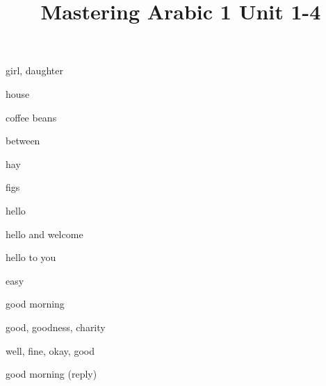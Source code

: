 \documentclass[avery5371,grid,frame]{flashcards}
\title{Mastering Arabic 1 Unit 1-4}
\begin{document}
\begin{flashcard}{\LARGE girl, daughter}
\LARGE {}
\end{flashcard}
\begin{flashcard}{\LARGE house}
\LARGE {}
\end{flashcard}
\begin{flashcard}{\LARGE coffee beans}
\LARGE {}
\end{flashcard}
\begin{flashcard}{\LARGE between}
\LARGE {}
\end{flashcard}
\begin{flashcard}{\LARGE hay}
\LARGE {}
\end{flashcard}
\begin{flashcard}{\LARGE figs}
\LARGE {}
\end{flashcard}
\begin{flashcard}{\LARGE hello}
\LARGE {}
\end{flashcard}
\begin{flashcard}{\LARGE hello and welcome}
\LARGE {}
\end{flashcard}
\begin{flashcard}{\LARGE hello to you}
\LARGE {}
\end{flashcard}
\begin{flashcard}{\LARGE easy}
\LARGE {}
\end{flashcard}
\begin{flashcard}{\LARGE good morning}
\LARGE {}
\end{flashcard}
\begin{flashcard}{\LARGE good, goodness, charity}
\LARGE {}
\end{flashcard}
\begin{flashcard}{\LARGE well, fine, okay, good}
\LARGE {}
\end{flashcard}
\begin{flashcard}{\LARGE good morning (reply)}
\LARGE {}
\end{flashcard}
\end{document}
